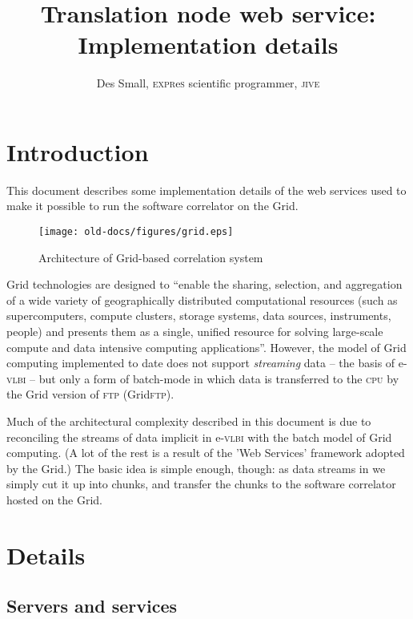 \documentclass[11pt]{article}
\title{Translation node web service: \\ Implementation details}
\author{Des Small, \textsc{expr}e\textsc{s} scientific
  programmer, \textsc{jive}}
\begin{document}
\maketitle

\section{Introduction}
This document describes some implementation details of the web services
used to make it possible to run the software correlator on the Grid.

\begin{figure}[h]
\texttt{[image: old-docs/figures/grid.eps]}
\caption{Architecture of Grid-based correlation system}
\end{figure}

Grid\cite{grid} technologies are designed to ``enable the sharing,
selection, and aggregation of a wide variety of geographically
distributed computational resources (such as supercomputers, compute
clusters, storage systems, data sources, instruments, people) and
presents them as a single, unified resource for solving large-scale
compute and data intensive computing applications''.  However, the
model of Grid computing implemented to date does not support
\emph{streaming} data -- the basis of e-\textsc{vlbi} -- but only a
form of batch-mode in which data is transferred to the \textsc{cpu} by
the Grid version of \textsc{ftp} (Grid\textsc{ftp}).

Much of the architectural complexity described in this document is due
to reconciling the streams of data implicit in e-\textsc{vlbi} with the
batch model of Grid computing.  (A lot of the rest is a result of the
'Web Services' framework adopted by the Grid.)  The basic idea is
simple enough, though: as data streams in we simply cut it up into
chunks, and transfer the chunks to the software correlator hosted on
the Grid.


\section{Details}

\subsection{Servers and services}
\end{document}
